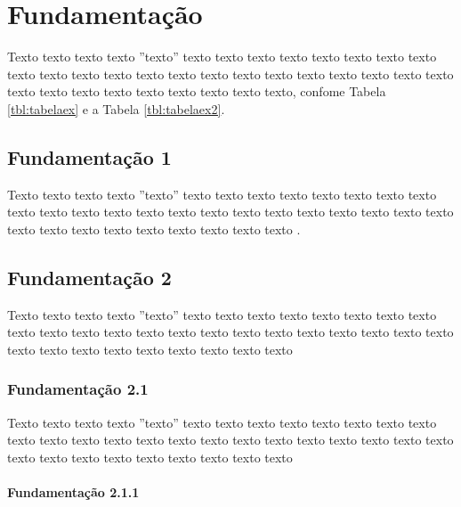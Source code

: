 \chapter{Fundamentação}
\label{chap:outrocapitulo}

Texto texto texto texto ''texto'' texto texto texto texto texto texto texto texto texto texto texto texto texto texto texto texto texto texto texto texto texto texto texto texto texto texto texto texto texto texto texto, confome Tabela \ref{tbl:tabelaex} e a Tabela \ref{tbl:tabelaex2}.





\section{Fundamentação 1}
\label{sec:section}

Texto texto texto texto ''texto'' texto texto texto texto texto texto texto texto texto texto texto texto texto texto texto texto texto texto texto texto texto texto texto texto texto texto texto texto texto texto texto \cite{gil2002elaborar}.


\section{Fundamentação 2}
\label{sec:outrasection}

Texto texto texto texto ''texto'' texto texto texto texto texto texto texto texto texto texto texto texto texto texto texto texto texto texto texto texto texto texto texto texto texto texto texto texto texto texto texto

\subsection{Fundamentação 2.1}
\label{sub:outrasubsectiona}

Texto texto texto texto ''texto'' texto texto texto texto texto texto texto texto texto texto texto texto texto texto texto texto texto texto texto texto texto texto texto texto texto texto texto texto texto texto texto


\subsubsection{Fundamentação 2.1.1}
\label{subsub:outrasubsubsection}

